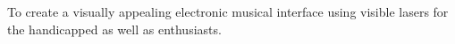 To create a visually appealing electronic musical interface using visible lasers for the handicapped as well as enthusiasts.
